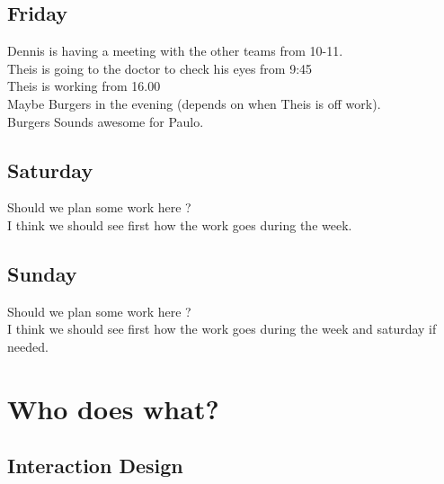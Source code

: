 \documentclass[10pt,a4paper]{article}
\begin{document}
\subsection{Friday}
Dennis is having a meeting with the other teams from 10-11.
\\ Theis is going to the doctor to check his eyes from 9:45
\\ Theis is working from 16.00
\\ Maybe Burgers in the evening (depends on when Theis is off work).
\\ Burgers Sounds awesome for Paulo.
\subsection{Saturday}
Should we plan some work here ?\\
I think we should see first how the work goes during the week.\\
\subsection{Sunday}
Should we plan some work here ?\\
I think we should see first how the work goes during the week and saturday if needed.\\

\section{Who does what?}
\subsection{Interaction Design}
\end{document}
